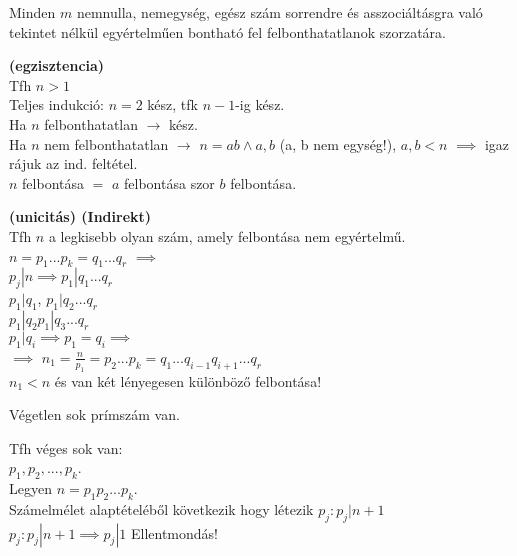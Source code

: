 \begin{frame}
  \begin{tcolorbox}[title={Tétel: A számelmélet alaptétele}]
    Minden $m$ nemnulla, nemegység, egész szám sorrendre és asszociáltásgra való tekintet nélkül egyértelműen bontható fel felbonthatatlanok szorzatára.
  \end{tcolorbox}

  \begin{tcolorbox}[title={Bizonyítás (Pozitívakra)}]
    \textbf{(egzisztencia)}\\
    Tfh $n > 1$\\
    Teljes indukció: $n = 2$ kész, tfk $n - 1$-ig kész.\\
    Ha $n$ felbonthatatlan $\rightarrow$ kész.\\
    Ha $n$ nem felbonthatatlan $\rightarrow$ $n = ab \land a, b$ (a, b nem egység!), $a, b < n$ $\implies$ igaz rájuk az ind. feltétel.\\
    $n$ felbontása $=$ $a$ felbontása szor $b$ felbontása.\\
    \bigskip

    \textbf{(unicitás) (Indirekt)}\\
    Tfh $n$ a legkisebb olyan szám, amely felbontása nem egyértelmű.\\
    $n = p_1 ... p_k = q_1 ... q_r$ $\implies$\\
    $p_j|n \implies p_1|q_1 ... q_r$\\
    $p_1|q_1$, $p_1|q_2 ... q_r$\\
               $p_1|q_2   p_1|q_3 ... q_r$\\
                          $p_1|q_i  \implies p_1 = q_i \implies$\\
    $\implies$ $n_1 = \frac{n}{p_1} = p_2 ... p_k = q_1 ... q_{i-1}q_{i+1} ... q_r$\\
    $n_1 < n$ és van két lényegesen különböző felbontása!
  \end{tcolorbox}
\end{frame}

\begin{frame}
  \begin{tcolorbox}[title={Tétel: Eukleidész tétele}]
    Végetlen sok prímszám van.
  \end{tcolorbox}

  \begin{tcolorbox}[title={Bizonyítás (Indirekt)}]
    Tfh véges sok van:\\
    $p_1, p_2, ... ,p_k$.\\
    Legyen $n = p_1p_2...p_k$.\\
    Számelmélet alaptételéből következik hogy létezik $p_j : p_j | n + 1$\\
    $p_j : p_j | n + 1 \implies p_j | 1$ Ellentmondás!
  \end{tcolorbox}
\end{frame}

